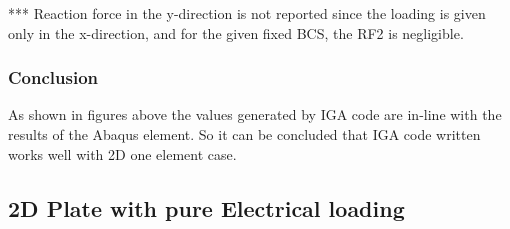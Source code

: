 \documentclass[11pt]{article}
\begin{document}
*** Reaction force in the y-direction is not reported since the loading is given only in the x-direction, and for the given fixed BCS, the RF2 is negligible.  \\

\subsubsection{Conclusion}
As shown in figures above the values generated by IGA code are in-line with the results of the Abaqus element. So it can be concluded that IGA code written works well with 2D one element case.






\subsection{2D Plate with pure Electrical loading}
\end{document}
